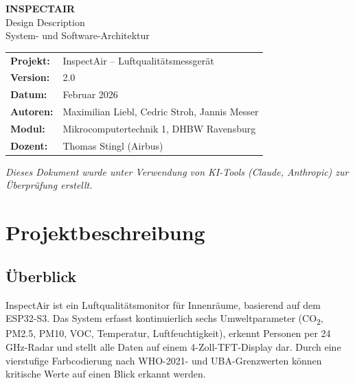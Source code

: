 \documentclass[a4paper,11pt]{article}
\begin{document}
\begin{center}
{\LARGE\textbf{INSPECTAIR}}\\[0.3cm]
{\Large Design Description}\\[0.3cm]
{\large System- und Software-Architektur}\\[0.5cm]
\begin{tabular}{ll}
\textbf{Projekt:} & InspectAir -- Luftqualitätsmessgerät \\
\textbf{Version:} & 2.0 \\
\textbf{Datum:} & Februar 2026 \\
\textbf{Autoren:} & Maximilian Liebl, Cedric Stroh, Jannis Messer \\
\textbf{Modul:} & Mikrocomputertechnik 1, DHBW Ravensburg \\
\textbf{Dozent:} & Thomas Stingl (Airbus) \\
\end{tabular}
\end{center}

\vspace{0.5cm}
\noindent\textit{Dieses Dokument wurde unter Verwendung von KI-Tools (Claude, Anthropic) zur Überprüfung erstellt.}
\vspace{0.3cm}

\tableofcontents
\newpage

\section{Projektbeschreibung}

\subsection{Überblick}
InspectAir ist ein Luftqualitätsmonitor für Innenräume, basierend auf dem ESP32-S3. Das System erfasst kontinuierlich sechs Umweltparameter (CO\textsubscript{2}, PM2.5, PM10, VOC, Temperatur, Luftfeuchtigkeit), erkennt Personen per 24\,GHz-Radar und stellt alle Daten auf einem 4-Zoll-TFT-Display dar. Durch eine vierstufige Farbcodierung nach WHO-2021- und UBA-Grenzwerten können kritische Werte auf einen Blick erkannt werden.
\end{document}

